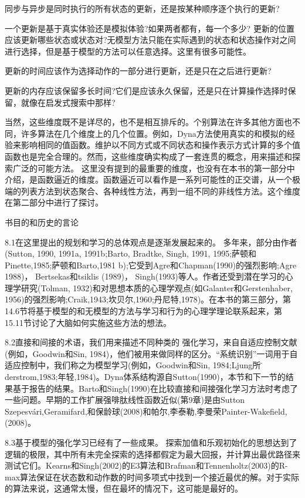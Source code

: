 同步与异步是同时执行的所有状态的更新，还是按某种顺序逐个执行的更新?

一个更新是基于真实体验还是模拟体验?如果两者都有，每一个多少?
更新的位置应该更新哪些状态或状态对?无模型方法只能在实际遇到的状态和状态操作对之间进行选择，但是基于模型的方法可以任意选择。这里有很多可能性。

更新的时间应该作为选择动作的一部分进行更新，还是只在之后进行更新?

更新的内存应该保留多长时间?它们是应该永久保留，还是只在计算操作选择时保留，就像在启发式搜索中那样?

当然，这些维度既不是详尽的，也不是相互排斥的。个别算法在许多其他方面也不同，许多算法在几个维度上的几个位置。例如，Dyna方法使用真实的和模拟的经验来影响相同的值函数。维护以不同方式或不同状态和操作表示方式计算的多个值函数也是完全合理的。然而，这些维度确实构成了一套连贯的概念，用来描述和探索广泛的可能方法。
这里没有提到的最重要的维度，也没有在本书的第一部分中介绍，是函数逼近的维度。函数逼近可以看作是一系列可能性的正交谱，从一个极端的列表方法到状态聚合、各种线性方法，再到一组不同的非线性方法。这个维度在第二部分中进行了探讨。


书目的和历史的言论

8.1在这里提出的规划和学习的总体观点是逐渐发展起来的。
多年来，部分由作者(Sutton, 1990, 1991a, 1991b;Barto, Bradtke, Singh, 1991, 1995;萨顿和Pinette,1985;萨顿和Barto,1981 b);它受到Agre和Chapman(1990)的强烈影响;Agre 1988)， Bertsekas和tsiklis (1989)， Singh(1993)等人。作者还受到潜在学习的心理学研究(Tolman, 1932)和对思想本质的心理学观点(如Galanter和Gerstenhaber, 1956)的强烈影响;Craik,1943;坎贝尔,1960;丹尼特,1978)。在本书的第三部分，第14.6节将基于模型的和无模型的方法与学习和行为的心理学理论联系起来，第15.11节讨论了大脑如何实施这些方法的想法。

8.2直接和间接的术语，我们用来描述不同种类的
强化学习，来自自适应控制文献(例如，Goodwin和Sin, 1984)，他们被用来做同样的区分。“系统识别”一词用于自适应控制中，我们称之为模型学习(例如，Goodwin和Sin, 1984;Ljung所以̈derstrom,1983;年轻,1984)。Dyna体系结构源自Sutton(1990)，本节和下一节的结果基于报告的结果。Barto和Singh(1990)在比较直接和间接强化学习方法时考虑了一些问题。早期的工作扩展强啡肽线性函数近似(第9章)是由Sutton Szepesvári,Geramifard,和保龄球(2008)和帕尔,李泰勒,李曼荣Painter-Wakefield,(2008)。

8.3基于模型的强化学习已经有了一些成果。
探索加值和乐观初始化的思想达到了逻辑的极限，其中所有未完全探索的选择都假定为最大回报，并计算出最优路径来测试它们。Kearns和Singh(2002)的E3算法和Brafman和Tennenholtz(2003)的R-max算法保证在状态数和动作数的时间多项式中找到一个接近最优的解。对于实际的算法来说，这通常太慢，但在最坏的情况下，这可能是最好的。

